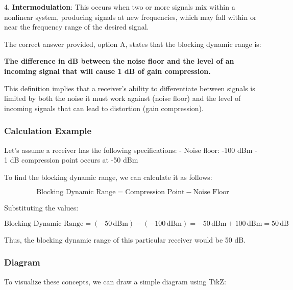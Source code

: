 4. \textbf{Intermodulation}: This occurs when two or more signals mix within a nonlinear system, producing signals at new frequencies, which may fall within or near the frequency range of the desired signal.

The correct answer provided, option A, states that the blocking dynamic range is:

\textbf{The difference in dB between the noise floor and the level of an incoming signal that will cause 1 dB of gain compression.}

This definition implies that a receiver's ability to differentiate between signals is limited by both the noise it must work against (noise floor) and the level of incoming signals that can lead to distortion (gain compression).

\subsubsection{Calculation Example}

Let's assume a receiver has the following specifications:
- Noise floor: -100 dBm
- 1 dB compression point occurs at -50 dBm

To find the blocking dynamic range, we can calculate it as follows:

\[
\text{Blocking Dynamic Range} = \text{Compression Point} - \text{Noise Floor}
\]

Substituting the values:

\[
\text{Blocking Dynamic Range} = (-50 \, \text{dBm}) - (-100 \, \text{dBm}) = -50 \, \text{dBm} + 100 \, \text{dBm} = 50 \, \text{dB}
\]

Thus, the blocking dynamic range of this particular receiver would be 50 dB.

\subsubsection{Diagram}

To visualize these concepts, we can draw a simple diagram using TikZ:

